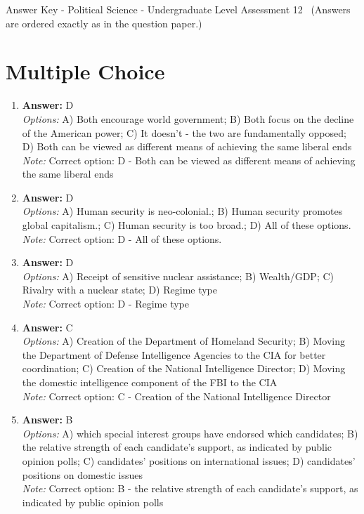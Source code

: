 \documentclass[12pt]{article}
\begin{document}
\begin{center}
Answer Key - Political Science - Undergraduate Level Assessment 12 \
\small (Answers are ordered exactly as in the question paper.)
\end{center}

\section*{Multiple Choice}
\begin{enumerate}[label=\arabic*.]
\item \textbf{Answer:} D
\\ \textit{Options:} A) Both encourage world government; B) Both focus on the decline of the American power; C) It doesn't - the two are fundamentally opposed; D) Both can be viewed as different means of achieving the same liberal ends
\\ \textit{Note:} Correct option: D - Both can be viewed as different means of achieving the same liberal ends
\item \textbf{Answer:} D
\\ \textit{Options:} A) Human security is neo-colonial.; B) Human security promotes global capitalism.; C) Human security is too broad.; D) All of these options.
\\ \textit{Note:} Correct option: D - All of these options.
\item \textbf{Answer:} D
\\ \textit{Options:} A) Receipt of sensitive nuclear assistance; B) Wealth/GDP; C) Rivalry with a nuclear state; D) Regime type
\\ \textit{Note:} Correct option: D - Regime type
\item \textbf{Answer:} C
\\ \textit{Options:} A) Creation of the Department of Homeland Security; B) Moving the Department of Defense Intelligence Agencies to the CIA for better coordination; C) Creation of the National Intelligence Director; D) Moving the domestic intelligence component of the FBI to the CIA
\\ \textit{Note:} Correct option: C - Creation of the National Intelligence Director
\item \textbf{Answer:} B
\\ \textit{Options:} A) which special interest groups have endorsed which candidates; B) the relative strength of each candidate's support, as indicated by public opinion polls; C) candidates' positions on international issues; D) candidates' positions on domestic issues
\\ \textit{Note:} Correct option: B - the relative strength of each candidate's support, as indicated by public opinion polls
\end{enumerate}
\end{document}
